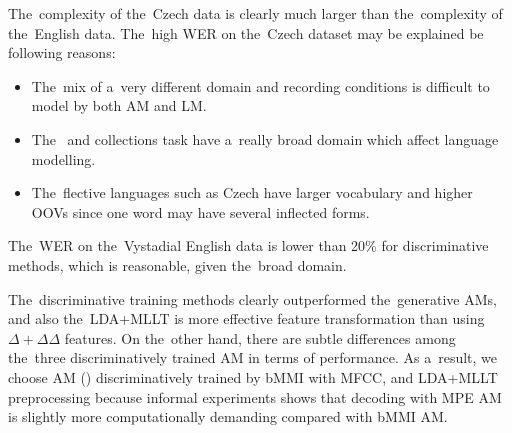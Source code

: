 

The~complexity of the~Czech data is clearly much larger than the~complexity of the~English data.
The~high \ac{WER} on the~Czech dataset may be explained be following reasons:
\begin{itemize}
    \item The~mix of a~very different domain and recording conditions is difficult to model by both \ac{AM} and \ac{LM}. 
    \item The~ and  collections task have a~really broad domain which affect language modelling.
    \item The~flective languages such as Czech have larger vocabulary and higher \acp{OOV} since one word may have several inflected forms.
\end{itemize}

The~\ac{WER} on the~Vystadial English data is lower than 20\% for discriminative methods, which is reasonable, given the~broad domain.

The~discriminative training methods clearly outperformed the~generative \acp{AM}, and also the~\ac{LDA}+\ac{MLLT} is more effective feature transformation than using $\Delta+\Delta\Delta$ features.
On the~other hand, there are subtle differences among the~three discriminatively trained \ac{AM} in terms of performance.
As a~result, we choose \ac{AM} () discriminatively trained by \ac{bMMI} with \ac{MFCC}, and \ac{LDA}+\ac{MLLT} preprocessing because informal experiments shows that decoding with \ac{MPE} \acl{AM} is slightly more computationally demanding compared with \ac{bMMI} \ac{AM}. 


